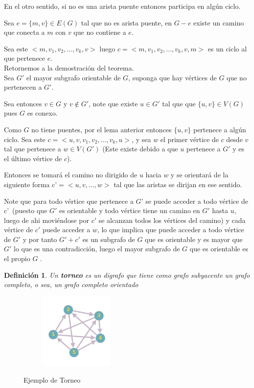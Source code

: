 \documentclass[a4paper,1pt]{report}
\newtheorem*{dfn}{Definición}
\begin{document}
En el otro sentido, si no es una arista puente entonces participa en algún ciclo.

Sea $e=\{m,v\}\in E(G)$ tal que no es arista puente, en $G-e$ existe un camino que conecta a $m$ con $v$ que no contiene a $e$. 

Sea este $<m,v_1,v_2,\dots,v_k,v>$  luego $c=<m,v_1,v_2,\dots,v_k,v,m>$ es un ciclo al que pertenece $e$.\\

Retornemos a la demostración del teorema.\\

Sea $G'$ el mayor subgrafo orientable de $G$, suponga que hay vértices de $G$ que no pertenecen a $G'$.

Sea entonces $v \in G$ y $v \notin G'$, note que existe $u \in G'$ tal que que $\{u,v\}\in V(G)$ pues $G$ es conexo.

Como $G$ no tiene puentes, por el lema anterior entonces $\{u,v\}$ pertenece a algún ciclo. Sea este $c=<u,v,v_1,v_2,\dots,v_k,u>$, y sea $w$ el primer vértice de $c$ desde $v$ tal que pertenece a $w \in V(G')$ (Este existe debido a que $u$ pertenece a $G'$ y es el último vértice de $c$).

Entonces se tomará el camino no dirigido de $u$ hacia $w$ y se orientar\'a de la siguiente forma c'$=<u,v,\dots,w>$ tal que las aristas se dirijan en ese sentido.

Note que para todo vértice que pertenece a $G$' se puede acceder a todo vértice de c'~(puesto que $G'$ es orientable y todo v\'ertice tiene un camino en $G'$ hasta $u$, luego de ahi movi\'endose por $c'$ se alcanzan todos los v\'ertices del camino) y cada vértice de $c'$ puede acceder a $w$, lo que implica que puede acceder a todo vértice de $G'$ y por tanto $G'+c'$ es un subgrafo de $G$ que es orientable y es mayor que $G'$ lo que es una contradicción, luego el mayor subgrafo de $G$ que es orientable es el propio $G$ .

\begin{dfn}
 Un \textbf{torneo} es un digrafo que tiene como grafo subyacente un grafo completo, o sea, un grafo completo orientado
\end{dfn}

\begin{figure}[H]
    \centering
    \begin{subfigure}[b]{0.80\textwidth}
        \centering
        \includegraphics[width=0.4\textwidth]{figures8/torneo.png}
    \end{subfigure} 
    \caption{Ejemplo de Torneo}
\end{figure} 
\end{document}
